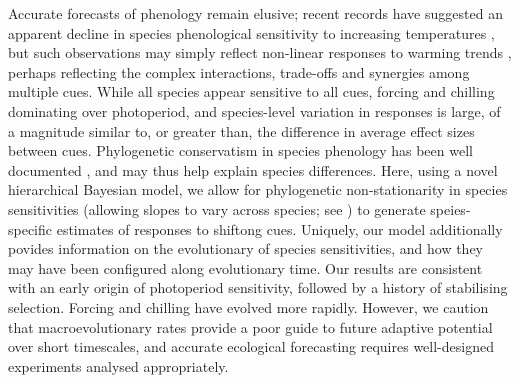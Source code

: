 \documentclass{article}\usepackage[]{graphicx}\usepackage[]{color}
\begin{document}
Accurate forecasts of phenology remain elusive; recent records have suggested an apparent decline in species phenological sensitivity to increasing temperatures \citep{fu2015,piao2017}, but such observations may simply reflect non-linear responses to warming trends \citep{wolkovich2021simple}, perhaps reflecting the complex interactions, trade-offs and synergies among multiple cues. While all species appear sensitive to all cues, forcing and chilling dominating over photoperiod, and species-level variation in responses is large, of a magnitude similar to, or greater than, the difference in average effect sizes between cues. Phylogenetic conservatism in species phenology has been well documented \citep{davies2013phylogenetic,rafferty2017global,joly2019importance}, and may thus help explain species differences. Here, using a novel hierarchical Bayesian model, we allow for phylogenetic non-stationarity in species sensitivities (allowing slopes to vary across species; see \citep{davies2019phylogenetically}) to generate speies-specific estimates of responses to shiftong cues. Uniquely, our model additionally povides information on the evolutionary of species sensitivities, and how they may have been configured along evolutionary time. Our results are consistent with an early origin of photoperiod sensitivity, followed by a history of stabilising selection. Forcing and chilling have evolved more rapidly. However, we caution that macroevolutionary rates provide a poor guide to future adaptive potential over short timescales, and accurate ecological forecasting requires well-designed experiments analysed appropriately.\\


\end{document}
